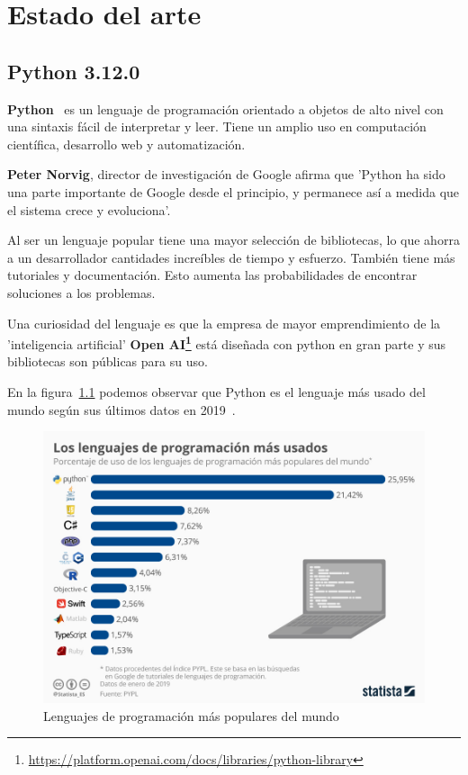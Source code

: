 \documentclass[a4paper, 12pt]{book}
\begin{document}
\cleardoublepage
\chapter{Estado del arte}
\label{chap:estado}


\section{Python 3.12.0} 
\label{sec:python}
\textbf{Python}~\cite{oracle:_python} es un lenguaje de programación orientado a objetos de alto nivel con una sintaxis fácil de interpretar y leer. Tiene un amplio uso en computación científica, desarrollo web y automatización.

\textbf{Peter Norvig}, director de investigación de Google afirma que 'Python ha sido una parte importante de Google desde el principio, y permanece así a medida que el sistema crece y evoluciona'.

Al ser un lenguaje popular tiene una mayor selección de bibliotecas, lo que ahorra a un desarrollador cantidades increíbles de tiempo y esfuerzo. También tiene más tutoriales y documentación. Esto aumenta las probabilidades de encontrar soluciones a los problemas.

Una curiosidad del lenguaje es que la empresa de mayor emprendimiento de la 'inteligencia artificial'  \textbf{ Open AI\footnote{\url{https://platform.openai.com/docs/libraries/python-library}}} está diseñada con python en gran parte y sus bibliotecas son públicas para su uso.

En la figura~\ref{fig:evolucion_python} podemos observar que Python es el lenguaje más usado del mundo según sus últimos datos en 2019~\cite{statista:_tecnología}.

\begin{figure}
	\centering
	\includegraphics[width=14cm, keepaspectratio]{img/ev_python.jpeg}
	\caption{Lenguajes de programación más populares del mundo}
	\label{fig:evolucion_python}
\end{figure}
\end{document}
